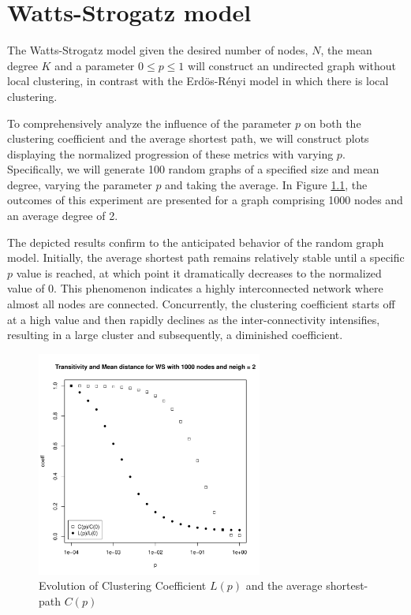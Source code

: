 \chapter{Watts-Strogatz model}
\label{cha: Watts-Strogatz model}
The Watts-Strogatz model given the desired number of nodes, $N$, the mean degree $K$ and a parameter $0 \leq p \leq 1$ will construct an undirected graph without local clustering, in contrast with the Erdös-Rényi model in which there is local clustering.

To comprehensively analyze the influence of the parameter $p$ on both the clustering coefficient and the average shortest path, we will construct plots displaying the normalized progression of these metrics with varying $p$. Specifically, we will generate 100 random graphs of a specified size and mean degree, varying the parameter $p$ and taking the average. In Figure \ref{fig:ws}, the outcomes of this experiment are presented for a graph comprising 1000 nodes and an average degree of 2.

The depicted results confirm to the anticipated behavior of the random graph model. Initially, the average shortest path remains relatively stable until a specific $p$ value is reached, at which point it dramatically decreases to the normalized value of 0. This phenomenon indicates a highly interconnected network where almost all nodes are connected. Concurrently, the clustering coefficient starts off at a high value and then rapidly declines as the inter-connectivity intensifies, resulting in a large cluster and subsequently, a diminished coefficient.

\begin{figure}
    \centering
    \includegraphics[width=0.66\textwidth]{figures/WS_neigh_2.pdf}
    \caption{Evolution of Clustering Coefficient $L(p)$ and the average shortest-path $C(p)$}
    \label{fig:ws}
\end{figure}

